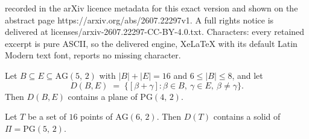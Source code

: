 \documentclass[10pt,a4paper]{amsart}
\newcommand{\AG}[2]{\mathrm{AG}(#1,\,#2)}
\newcommand{\PG}[2]{\mathrm{PG}(#1,\,#2)}
\begin{document}
recorded in the arXiv licence metadata for this exact version and shown on the abstract page https://arxiv.org/abs/2607.22297v1. A full rights notice is delivered at licenses/arxiv-2607.22297-CC-BY-4.0.txt. Characters: every retained excerpt is pure ASCII, so the delivered engine, XeLaTeX with its default Latin Modern text font, reports no missing character.
\begin{lem}\label{lem:BC}
Let $B\subseteq E\subseteq\AG52$ with $|B|+|E|=16$ and $6\le|B|\le8$, and let
\[
D(B,E)\;=\;\bigl\{[\beta+\gamma] : \beta\in B,\ \gamma\in E,\ \beta\neq\gamma\bigr\}.
\]
Then $D(B,E)$ contains a plane of $\PG42$.
\end{lem}

\begin{thm}\label{thm:dir16}
Let $T$ be a set of $16$ points of $\AG62$.  Then $D(T)$ contains a solid of $\Pi=\PG52$.
\end{thm}
\end{document}
